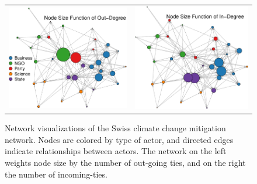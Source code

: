 \documentclass[12pt,onesided,pdflatex]{amsart}
\begin{document}
\begin{figure}[ht]
	\centering
	\begin{tabular}{cc}
	\includegraphics[width=.47\textwidth]{dvNet_outDegree} & 
	\includegraphics[width=.44\textwidth]{dvNet_inDegree}
	\end{tabular}
	\caption{Network visualizations of the Swiss climate change mitigation network. Nodes are colored by type of actor, and directed edges indicate relationships between actors. The network on the left weights node size by the number of out-going ties, and on the right the number of incoming-ties.}
	\label{fig:dvNet}
\end{figure}
\FloatBarrier
\end{document}
